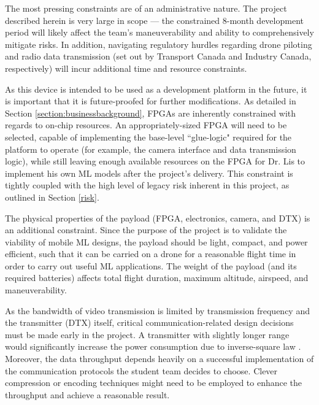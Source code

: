 The most pressing constraints are of an administrative nature. The project described
herein is very large in scope --- the constrained 8-month development period 
will likely affect the team's maneuverability and ability to comprehensively mitigate risks. 
In addition, navigating regulatory hurdles regarding drone piloting and radio data transmission (set out by 
Transport Canada and Industry Canada, respectively) will incur additional time and resource constraints.

As this device is intended to be used as a development platform in the future, it is important that it is future-proofed for further modifications. As detailed in Section \ref{section:businessbackground}, FPGAs are
inherently constrained with regards to on-chip resources. An appropriately-sized FPGA will need to be selected, capable of
implementing the base-level ``glue-logic" required for the platform to operate (for example, the camera interface and data transmission logic), while still
leaving enough available resources on the FPGA for Dr. Lis to implement his own ML models after the project's delivery. 
This constraint is tightly coupled with the high level of legacy risk inherent in this project, as outlined in Section \ref{risk}.

The physical properties of the payload (FPGA, electronics, camera, and  DTX) is an additional constraint. Since the purpose of the project
is to validate the viability of mobile ML designs, the payload should be light, compact, and power efficient, such
that it can be carried on a drone for a reasonable flight time in order to carry out useful ML applications.
The weight of the payload (and its required batteries) affects total flight duration, maximum altitude, airspeed, and maneuverability. 

As the bandwidth of video transmission is limited by transmission frequency and the transmitter (DTX) itself, 
critical communication-related design decisions must be made early in the project.
A transmitter with slightly longer range would significantly increase the power consumption due to inverse-square law \cite{wiki-inverse-square}.
Moreover, the data throughput depends heavily on a successful implementation of the communication
protocols the student team decides to choose. Clever compression or encoding techniques might need to be
employed to enhance the throughput and achieve a reasonable result.

